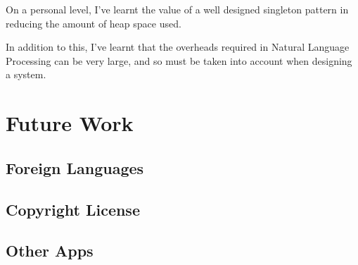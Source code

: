 \documentclass[12pt]{article}
\begin{document}
On a personal level, I've learnt the value of a well designed singleton pattern in reducing the amount of heap space used. 

In addition to this, I've learnt that the overheads required in Natural Language Processing can be very large, and so must be taken into account when designing a system. 


\newpage

\section{Future Work}

\subsection{Foreign Languages}

\subsection{Copyright License}

\subsection{Other Apps}


\newpage

\printbibliography[heading=bibintoc]


\newpage
\end{document}
